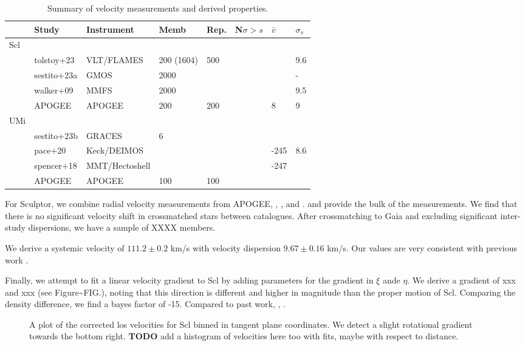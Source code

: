 \begin{table*}[t]
\centering
\caption{Summary of velocity measurements and derived properties.}
\label{tbl:Summary-of-velocity-measurements-and-derived-properties}
\begin{tabular}{llllllll}
\toprule
 & Study & Instrument & Memb & Rep. & N$\sigma > s$ & $\bar v$ & $\sigma_v$\\
\midrule
Scl &  &  &  &  &  &  & \\
 & tolstoy+23 & VLT/FLAMES & 200 (1604) & 500 &  &  & 9.6\\
 & sestito+23a & GMOS & 2000 &  &  &  & -\\
 & walker+09 & MMFS & 2000 &  &  &  & 9.5\\
 & APOGEE & APOGEE & 200 & 200 &  & 8 & 9\\
UMi &  &  &  &  &  &  & \\
 & sestito+23b & GRACES & 6 &  &  &  & \\
 & pace+20 & Keck/DEIMOS &  &  &  & -245 & 8.6\\
 & spencer+18 & MMT/Hectoshell &  &  &  & -247 & \\
 & APOGEE & APOGEE & 100 & 100 &  &  & \\
\bottomrule
\end{tabular}
\end{table*}

For Sculptor, we combine radial velocity measurements from APOGEE,
\citet{sestito+2023a}, \citet{tolstoy+2023}, and \citet{WMO2009}.
\citet{tolstoy+2023} and \citet{WMO2009} provide the bulk of the
measurements. We find that there is no significant velocity shift in
crossmatched stars between catalogues. After crossmatching to Gaia and
excluding significant inter-study dispersions, we have a sample of XXXX
members.

We derive a systemic velocity of \(111.2\pm0.2\) km/s with velocity
dispersion \(9.67\pm0.16\) km/s. Our values are very consistent with
previous work \citep[e.g.][\citet{arroyo-polonio+2024},
\citet{tolstoy+2023}]{WMO2009}.

Finally, we attempt to fit a linear velocity gradient to Scl by adding
parameters for the gradient in \(\xi\) ande \(\eta\). We derive a
gradient of xxx and xxx (see Figure\textasciitilde FIG.), noting that
this direction is different and higher in magnitude than the proper
motion of Scl. Comparing the density difference, we find a bayes factor
of -15. Compared to past work, \citet{battaglia+2008},
\citet{arroyo-polonio+2021}.

\begin{figure}
\centering
{}
\caption[Scl velocity sample]{A plot of the corrected los velocities for
Scl binned in tangent plane coordinates. We detect a slight rotational
gradient towards the bottom right. \textbf{TODO} add a histogram of
velocities here too with fits, maybe with respect to distance.}
\end{figure}

